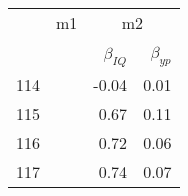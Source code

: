 \begin{tabular}{lrrrr}
\hline
   & \multicolumn{2}{|c|}{m1} & \multicolumn{2}{|c|}{m2} \\ \\
 &   &   & $\beta_{IQ}$  & $\beta_{yp}$  \\
\hline
114 &   &   & -0.04  & 0.01  \\
115 &   &   & 0.67  & 0.11  \\
116 &   &   & 0.72  & 0.06  \\
117 &   &   & 0.74  & 0.07  \\
\hline
\end{tabular}%
